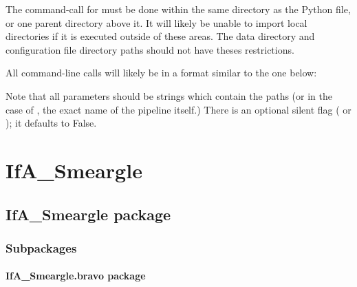 \documentclass[letterpaper,10pt,english]{sphinxmanual}
\begin{document}
The command-call for  must be done within the same directory
as the Python file, or one parent directory above it. It will likely be unable
to import local directories if it is executed outside of these areas. The
data directory and configuration file directory paths should not have theses
restrictions.

All command-line calls will likely be in a format similar to the one below:

\begin{sphinxVerbatim}[commandchars=\\\{\}]
    
\end{sphinxVerbatim}

Note that all parameters should be strings which contain the paths (or in the
case of , the exact name of the pipeline itself.) There is
an optional silent flag ( or ); it defaults to False.


\chapter{IfA\_Smeargle}
\label{\detokenize{python_docstrings/modules:ifa-smeargle}}\label{\detokenize{python_docstrings/modules::doc}}

\section{IfA\_Smeargle package}
\label{\detokenize{python_docstrings/IfA_Smeargle:ifa-smeargle-package}}\label{\detokenize{python_docstrings/IfA_Smeargle::doc}}

\subsection{Subpackages}
\label{\detokenize{python_docstrings/IfA_Smeargle:subpackages}}

\subsubsection{IfA\_Smeargle.bravo package}
\label{\detokenize{python_docstrings/IfA_Smeargle.bravo:ifa-smeargle-bravo-package}}\label{\detokenize{python_docstrings/IfA_Smeargle.bravo::doc}}
\end{document}

